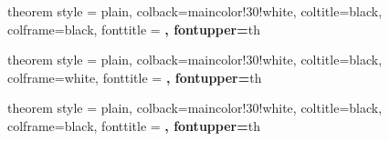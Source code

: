 \usepackage{appendixnumberbeamer}
\usepackage{booktabs}
\usepackage[scale=2]{ccicons}
\usepackage{tcolorbox}
\usepackage{pgfplots}
\usepackage{xspace}
\usepackage{tikz-cd}
\newcommand{\themename}{\textbf{\textsc{metropolis}}\xspace}
\usepackage{graphicx}
\usepackage{subcaption}

\DeclareMathOperator{\Coh}{Coh}

\newcommand{\calP}{\mathcal{P}}
\newcommand{\calE}{\mathcal{E}}
\newcommand{\calF}{\mathcal{F}}

 {theorem style = plain, colback=maincolor!30!white, coltitle=black, colframe=black, fonttitle = \upshape\bfseries, fontupper=\itshape}{th}

 {theorem style = plain, colback=maincolor!30!white, coltitle=black, colframe=white, fonttitle = \upshape\bfseries, fontupper=\itshape}{th}

 {theorem style = plain, colback=maincolor!30!white, coltitle=black, colframe=black, fonttitle = \upshape\bfseries, fontupper=\upshape}{th}
